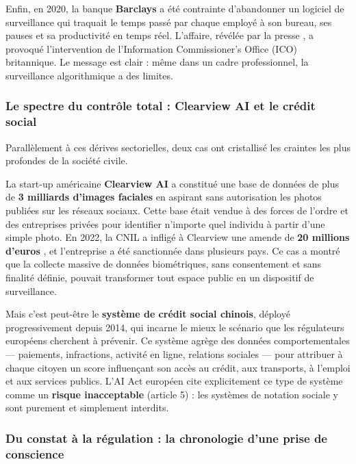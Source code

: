\documentclass[12pt,a4paper]{article}
\begin{document}
Enfin, en 2020, la banque \textbf{Barclays} a été contrainte d'abandonner un logiciel de surveillance qui traquait le temps passé par chaque employé à son bureau, ses pauses et sa productivité en temps réel. L'affaire, révélée par la presse \cite{barclays_surveillance}, a provoqué l'intervention de l'Information Commissioner's Office (ICO) britannique. Le message est clair : même dans un cadre professionnel, la surveillance algorithmique a des limites.

\subsubsection{Le spectre du contrôle total : Clearview AI et le crédit social}

Parallèlement à ces dérives sectorielles, deux cas ont cristallisé les craintes les plus profondes de la société civile.

La start-up américaine \textbf{Clearview AI} a constitué une base de données de plus de \textbf{3 milliards d'images faciales} en aspirant sans autorisation les photos publiées sur les réseaux sociaux. Cette base était vendue à des forces de l'ordre et des entreprises privées pour identifier n'importe quel individu à partir d'une simple photo. En 2022, la CNIL a infligé à Clearview une amende de \textbf{20 millions d'euros} \cite{clearview_cnil}, et l'entreprise a été sanctionnée dans plusieurs pays. Ce cas a montré que la collecte massive de données biométriques, sans consentement et sans finalité définie, pouvait transformer tout espace public en un dispositif de surveillance.

Mais c'est peut-être le \textbf{système de crédit social chinois}, déployé progressivement depuis 2014, qui incarne le mieux le scénario que les régulateurs européens cherchent à prévenir. Ce système agrège des données comportementales --- paiements, infractions, activité en ligne, relations sociales --- pour attribuer à chaque citoyen un score influençant son accès au crédit, aux transports, à l'emploi et aux services publics. L'AI Act européen cite explicitement ce type de système comme un \textbf{risque inacceptable} (article 5) : les systèmes de notation sociale y sont purement et simplement interdits.

\subsubsection{Du constat à la régulation : la chronologie d'une prise de conscience}
\end{document}
